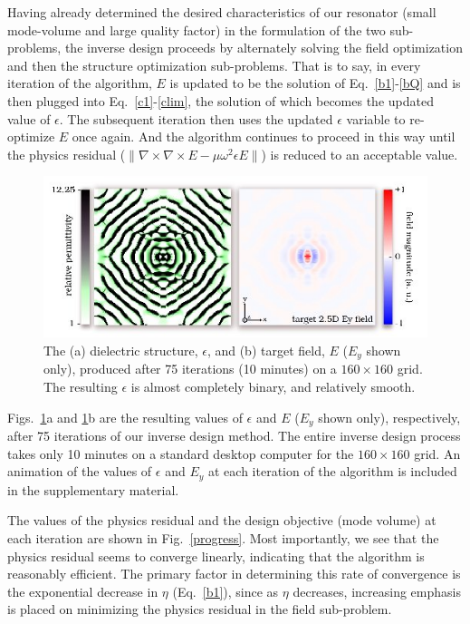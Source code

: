 \documentclass[10pt,letterpaper]{article}
\begin{document}
Having already determined the desired characteristics of our resonator (small mode-volume and large quality factor) in the formulation of the two sub-problems, the inverse design proceeds by alternately solving the field optimization and then the structure optimization sub-problems. That is to say, in every iteration of the algorithm, $E$ is updated to be the solution of Eq.~\ref{b1}-\ref{bQ} and is then plugged into Eq.~\ref{c1}-\ref{clim}, the solution of which becomes the updated value of $\epsilon$. The subsequent iteration then uses the updated $\epsilon$ variable to re-optimize $E$ once again. And the algorithm continues to proceed in this way until the physics residual ($\|\nabla\times\nabla\times E - \mu\omega^2\epsilon E\|$) is reduced to an acceptable value.

\begin{figure}[hbt]
\centering\includegraphics[width=\textwidth]{target}
\caption{The (a) dielectric structure, $\epsilon$, and (b) target field, $E$ ($E_y$ shown only), produced after 75 iterations (10 minutes) on a $160\times 160$ grid. The resulting $\epsilon$ is almost completely binary, and relatively smooth.}\label{target}
\end{figure}
Figs.~\ref{target}a and \ref{target}b are the resulting values of $\epsilon$ and $E$ ($E_y$ shown only), respectively, after 75 iterations of our inverse design method. The entire inverse design process takes only 10 minutes on a standard desktop computer for the $160 \times 160$ grid. An animation of the values of $\epsilon$ and $E_y$ at each iteration of the algorithm is included in the supplementary material.  

The values of the physics residual and the design objective (mode volume) at each iteration are shown in Fig.~\ref{progress}. Most importantly, we see that the physics residual seems to converge linearly, indicating that the algorithm is reasonably efficient. The primary factor in determining this rate of convergence is the exponential decrease in $\eta$ (Eq.~\ref{b1}), since as $\eta$ decreases, increasing emphasis is placed on minimizing the physics residual in the field sub-problem. 
\end{document}
